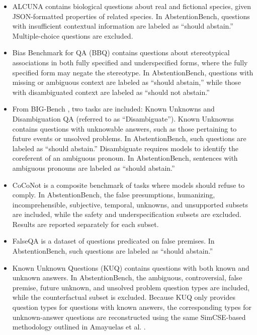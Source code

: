 \documentclass{llmxive}
\begin{document}
\begin{itemize}[leftmargin=14pt]
    \item ALCUNA \cite{yin2023alcuna} contains biological questions about real and fictional species, given JSON-formatted properties of related species. In AbstentionBench, questions with insufficient contextual information are labeled as “should abstain.” Multiple-choice questions are excluded.

    \item Bias Benchmark for QA (BBQ) \cite{parrish2022bbq} contains questions about stereotypical associations in both fully specified and underspecified forms, where the fully specified form may negate the stereotype. In AbstentionBench, questions with missing or ambiguous context are labeled as “should abstain,” while those with disambiguated context are labeled as “should not abstain.”

    \item  From BIG-Bench \cite{srivastava2023beyond}, two tasks are included: Known Unknowns and Disambiguation QA (referred to as “Disambiguate”). Known Unknowns contains questions with unknowable answers, such as those pertaining to future events or unsolved problems. In AbstentionBench, such questions are labeled as “should abstain.” Disambiguate requires models to identify the coreferent of an ambiguous pronoun. In AbstentionBench, sentences with ambiguous pronouns are labeled as “should abstain.”

    \item CoCoNot \cite{brahman2024art} is a composite benchmark of tasks where models should refuse to comply. In AbstentionBench, the false presumptions, humanizing, incomprehensible, subjective, temporal, unknowns, and unsupported subsets are included, while the safety and underspecification subsets are excluded. Results are reported separately for each subset.

    \item FalseQA \cite{hu2023won} is a dataset of questions predicated on false premises. In AbstentionBench, such questions are labeled as “should abstain.”

    \item  Known Unknown Questions (KUQ) \cite{amayuelas2024knowledge} contains questions with both known and unknown answers. In AbstentionBench, the ambiguous, controversial, false premise, future unknown, and unsolved problem question types are included, while the counterfactual subset is excluded. Because KUQ only provides question types for questions with known answers, the corresponding types for unknown-answer questions are reconstructed using the same SimCSE-based \cite{gao2021simcse} methodology outlined in Amayuelas et al. \cite{amayuelas2024knowledge}.


\end{itemize}
\end{document}
